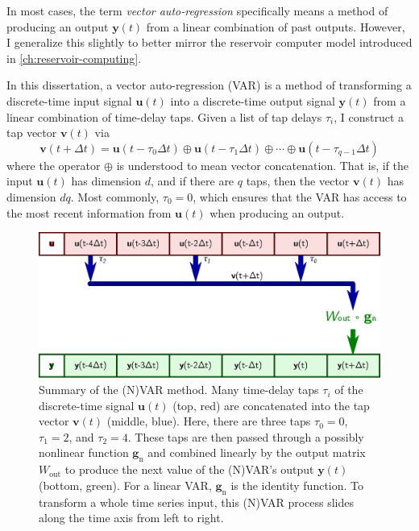 In most cases, the term \emph{vector auto-regression} specifically
means a method of producing an output $\bm{y}(t)$ from a linear
combination of past outputs. However, I generalize this slightly
to better mirror the reservoir computer model introduced in
\cref{ch:reservoir-computing}.

In this dissertation, a vector auto-regression (VAR) is a method of
transforming a discrete-time input signal $\bm{u}(t)$ into a
discrete-time output signal $\bm{y}(t)$ from a linear combination of
time-delay taps. Given a list of tap delays $\tau_i$, I construct
a tap vector $\bm{v}(t)$ via
\begin{equation}
  \label{eq:var-v}
  \bm{v}(t + \Delta t) = \bm{u}(t - \tau_0 \Delta t) \oplus \bm{u}(t - \tau_1 \Delta t) \oplus \cdots \oplus \bm{u}(t - \tau_{q-1} \Delta t)
\end{equation}
where the operator $\oplus$ is understood to mean vector
concatenation. That is, if the input $\bm{u}(t)$ has dimension $d$,
and if there are $q$ taps, then the vector $\bm{v}(t)$ has dimension
$dq$. Most commonly, $\tau_0 = 0$, which ensures that the VAR has access to the most recent information from $\bm{u}(t)$ when producing an output.

\begin{figure}
  \includegraphics{figures/var-infer}
    \caption{Summary of the (N)VAR method. Many time-delay taps $\tau_i$
    of the discrete-time signal $\bm{u}(t)$ (top, red) are concatenated into the tap
    vector $\bm{v}(t)$ (middle, blue). Here, there are three taps
    $\tau_0=0$, $\tau_1=2$, and $\tau_2=4$. These taps are then passed
    through a possibly nonlinear function $\bm{g}_\text{n}$ and
    combined linearly by the output matrix $W_\text{out}$ to produce
    the next value of the (N)VAR's output $\bm{y}(t)$ (bottom,
    green). For a linear VAR, $\bm{g}_\text{n}$ is the identity
    function. To transform a whole time series input, this (N)VAR process
    slides along the time axis from left to right.}
  \label{fig:var-infer}
\end{figure}

